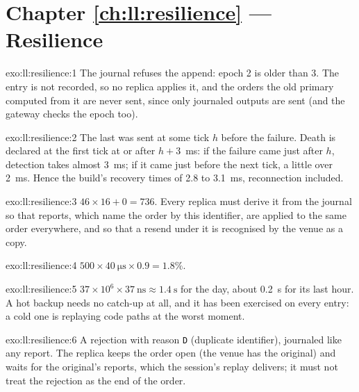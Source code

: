 \section*{Chapter \ref{ch:ll:resilience} --- Resilience}

\begin{solution}{exo:ll:resilience:1}
The journal refuses the append: epoch 2 is older than 3. The entry is not recorded, so no replica applies it, and the orders
the old primary computed from it are never sent, since only journaled outputs are sent (and the gateway checks the epoch too).
\end{solution}

\begin{solution}{exo:ll:resilience:2}
The last  was sent at some tick $h$ before the failure. Death is declared at the first tick at or after $h + 3$~ms: if
the failure came just after $h$, detection takes almost \qty{3}{\milli\second}; if it came just before the next tick, a little
over \qty{2}{\milli\second}. Hence the build's recovery times of 2.8 to \qty{3.1}{\milli\second}, reconnection included.
\end{solution}

\begin{solution}{exo:ll:resilience:3}
$46 \times 16 + 0 = 736$. Every replica must derive it from the journal so that reports, which name the order by this
identifier, are applied to the same order everywhere, and so that a resend under it is recognised by the venue as a copy.
\end{solution}

\begin{solution}{exo:ll:resilience:4}
$500 \times \qty{40}{\micro\second} \times 0.9 = 1.8\%$.
\end{solution}

\begin{solution}{exo:ll:resilience:5}
$37 \times 10^6 \times \qty{37}{\nano\second} \approx \qty{1.4}{\second}$ for the day, about \qty{0.2}{\second} for its last
hour. A hot backup needs no catch-up at all, and it has been exercised on every entry: a cold one is replaying code paths at
the worst moment.
\end{solution}

\begin{solution}{exo:ll:resilience:6}
A rejection with reason \texttt{D} (duplicate identifier), journaled like any report. The replica keeps the order open (the
venue has the original) and waits for the original's reports, which the session's replay delivers; it must not treat the
rejection as the end of the order.
\end{solution}

